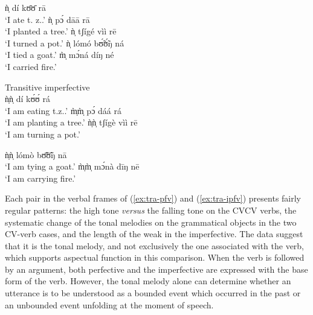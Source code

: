 \begin{exe}
\begin{exe}
\begin{exe}
\begin{exe}
\begin{exe}
\begin{exe}
\begin{exe}
\begin{exe}
\begin{exe}
\begin{exe}
\begin{exe}
  \ea\label{ex:tra-pfv-eat}
ǹ̩ dí kʊ̄ʊ̄ rā\\
{\rm  `I ate {\sc t. z.}.'} 
 \ex\label{ex:tra-pfv-plant}
ǹ̩ pɔ́ dāā rā\\
{\rm `I planted a {\sc tree}.'}
 \ex\label{ex:tra-pfv-cover}
ǹ̩ tʃígé vìì rē\\
{\rm `I turned a {\sc  pot}.'} 
 \ex\label{ex:tra-pfv-tie}
ǹ̩ lómó bʊ̃́ʊ̃́ŋ ná\\
{\rm `I tied a {\sc goat}.'}
 \ex\label{ex:tra-pfv-carry}
m̩̀ mɔ́ná díŋ né\\
{\rm `I carried {\sc fire}.'} 

\z 
 \z

\ea\label{ex:tra-ipfv}{\rm Transitive imperfective}\\

 \ea\label{ex:tra-ipfv-eat}
ǹ̩ǹ̩ dí kʊ́ʊ́ rá\\
{\rm `I am eating {\sc t.z.}.'}
 \ex\label{ex:tra-ipfv-plant}
m̩̀m̩̀ pɔ́ dáá rá\\
{\rm `I am planting a {\sc  tree}.'} 
 \ex\label{ex:tra-ipfv-cover}
ǹ̩ǹ̩ tʃígè vìì rē\\
{\rm `I am turning  a {\sc pot}.'} 

 \ex\label{ex:tra-ipfv-tie}
ǹ̩ǹ̩ lómò bʊ̃̄ʊ̃̄ŋ nā\\
{\rm `I am tying  a {\sc goat}.'} 
 \ex\label{ex:tra-ipfv-carry}
m̩̀m̩̀ mɔ́nà dīŋ nē\\
{\rm `I am carrying  {\sc fire}.'}

\z 
 \z
 


Each pair in the verbal frames of  (\ref{ex:tra-pfv}) and (\ref{ex:tra-ipfv}) presents fairly regular patterns:  the high tone {\it versus} the falling tone on the CVCV verbs, the systematic change of the tonal melodies on the grammatical objects in the two CV-verb cases, and the length of the weak   in the imperfective. The data suggest that it is the tonal melody, and not exclusively the one associated with the verb, which supports aspectual function in this comparison. When the verb is followed by an argument, both perfective and the imperfective are expressed with the base form of the verb.  However,  the tonal melody alone  can determine whether an utterance is to be understood as a bounded event which occurred in the past or an unbounded event unfolding at the moment of speech.




\end{exe}
\end{exe}
\end{exe}
\end{exe}
\end{exe}
\end{exe}
\end{exe}
\end{exe}
\end{exe}
\end{exe}
\end{exe}
